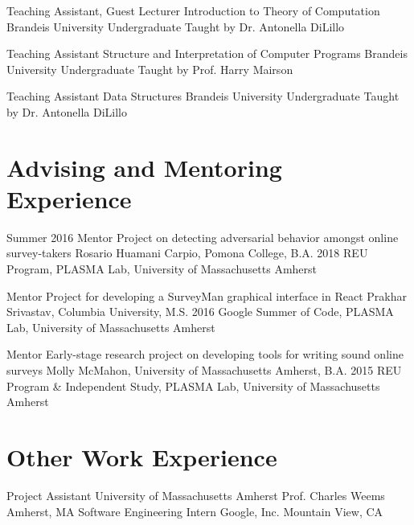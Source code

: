 \documentclass[11pt,a4paper,sans]{moderncv} %
\newcommand{\umass}{University of Massachusetts Amherst}
\begin{document}
    {Teaching Assistant, Guest Lecturer}
    {Introduction to Theory of Computation}
    {Brandeis University}
    {Undergraduate}
    {Taught by Dr. Antonella DiLillo}

    {Teaching Assistant}
    {Structure and Interpretation of Computer Programs}
    {Brandeis University}
    {Undergraduate}
    {Taught by Prof. Harry Mairson}
    
    {Teaching Assistant}
    {Data Structures}
    {Brandeis University}
    {Undergraduate}
    {Taught by Dr. Antonella DiLillo}

\section{Advising and Mentoring Experience}
  
    \cventry    
    {Summer 2016}
{Mentor}
    {Project on detecting adversarial behavior amongst online survey-takers}
    {Rosario Huamani Carpio, Pomona College, B.A.  2018}
    {}
    {REU Program, PLASMA Lab, University of Massachusetts Amherst}

{Mentor}
    {Project for developing a SurveyMan graphical interface in React}
    {Prakhar Srivastav, Columbia University, M.S. 2016}
    {}
    {Google Summer of Code, PLASMA Lab, University of Massachusetts Amherst}
    

{Mentor}
    {Early-stage research project on developing tools for writing sound online surveys}
    {Molly McMahon, \umass{}, B.A. 2015}
    {}
    {REU Program \& Independent Study, PLASMA Lab, University of Massachusetts Amherst}
    





\section{Other Work Experience}

 {Project Assistant}  
 {\umass{}} 
 {Prof. Charles Weems}
 {Amherst, MA}
 {}
{Software Engineering Intern} 
{Google, Inc.}
{}
{Mountain View, CA}
{}
\end{document}
